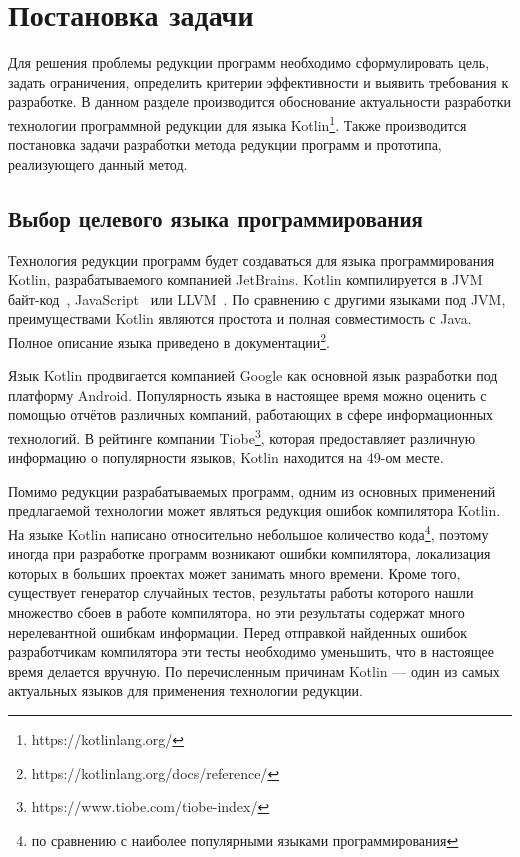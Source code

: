 \chapter{Постановка задачи}
Для решения проблемы редукции программ необходимо сформулировать цель, задать ограничения, определить критерии эффективности и выявить требования к разработке. В данном разделе производится обоснование актуальности разработки технологии программной редукции для языка Kotlin\footnote{https://kotlinlang.org/}. Также производится постановка задачи разработки метода редукции программ и прототипа, реализующего данный метод.

\section{Выбор целевого языка программирования}
Технология редукции программ будет создаваться для языка программирования Kotlin, разрабатываемого компанией JetBrains. Kotlin компилируется в JVM байт-код~\cite{dahm1999byte}, JavaScript~\cite{flanagan2006javascript} или LLVM~\cite{lattner2004llvm}. По сравнению с другими языками под JVM, преимуществами Kotlin являются простота и полная совместимость с Java. Полное описание языка приведено в документации\footnote{https://kotlinlang.org/docs/reference/}.

Язык Kotlin продвигается компанией Google как основной язык разработки под платформу Android. Популярность языка в настоящее время можно оценить с помощью отчётов различных компаний, работающих в сфере информационных технологий. В рейтинге компании Tiobe\footnote{https://www.tiobe.com/tiobe-index/}, которая предоставляет различную информацию о популярности языков, Kotlin находится на 49-ом месте.

Помимо редукции разрабатываемых программ, одним из основных применений предлагаемой технологии может являться редукция ошибок компилятора Kotlin. На языке Kotlin написано относительно небольшое количество кода\footnote{по сравнению с наиболее популярными языками программирования}, поэтому иногда при разработке программ возникают ошибки компилятора, локализация которых в больших проектах может занимать много времени. Кроме того, существует генератор случайных тестов, результаты работы которого нашли множество сбоев в работе компилятора, но эти результаты содержат много нерелевантной ошибкам информации. Перед отправкой найденных ошибок разработчикам компилятора эти тесты необходимо уменьшить, что в настоящее время делается вручную. По перечисленным причинам Kotlin --- один из самых актуальных языков для применения технологии редукции.

